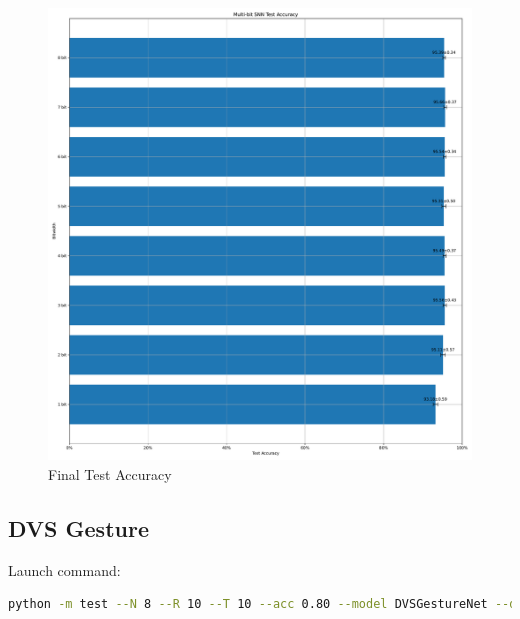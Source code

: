         \begin{figure}[H]
            \centering
            \includegraphics[width=\textwidth]{../standard/NMNIST/plots/nmnist_final_acc.pdf}
            \caption{Final Test Accuracy}
        \end{figure}

    \subsection{DVS Gesture}
    \label{appendix:accuracy_curves_dvs_gesture}
        Launch command: 
        \begin{lstlisting}[language=Bash, basicstyle=\small, breaklines=true]
python -m test --N 8 --R 10 --T 10 --acc 0.80 --model DVSGestureNet --data-path /scratch/zyi/codeSpace/data --dataset DVSGesture --batch-size 128 --opt adam --lr 1e-3 --lr-scheduler cosa --epochs 20 --lr-warmup-epochs 0 --output-dir /scratch/zyi/codeSpace/MultibitSpikes
        \end{lstlisting}

